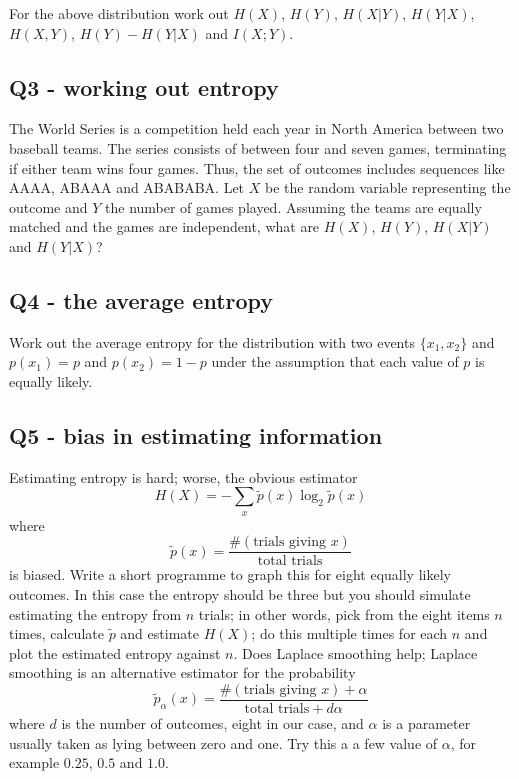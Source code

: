 \documentclass[12pt]{article}
\begin{document}
For the above distribution work out $H(X)$, $H(Y)$, $H(X|Y)$,
$H(Y|X)$, $H(X,Y)$, $H(Y)-H(Y|X)$ and $I(X;Y)$.

\subsection*{Q3 - working out entropy}

The World Series is a competition held each year in North America
between two baseball teams. The series consists of between four and
seven games, terminating if either team wins four games. Thus, the set
of outcomes includes sequences like AAAA, ABAAA and ABABABA. Let $X$
be the random variable representing the outcome and $Y$ the number of
games played. Assuming the teams are equally matched and the games are
independent, what are $H(X)$, $H(Y)$, $H(X|Y)$ and $H(Y|X)$?

\subsection*{Q4 - the average entropy}

Work out the average entropy for the distribution with two events
$\{x_1,x_2\}$ and $p(x_1)=p$ and $p(x_2)=1-p$ under the assumption
that each value of $p$ is equally likely.


\subsection*{Q5 - bias in estimating information}

Estimating entropy is hard; worse, the obvious estimator
\begin{equation}
  H(X)=-\sum_x \tilde{p}(x)\log_2\tilde{p}(x)
\end{equation}
where
\begin{equation}
  \tilde{p}(x)=\frac{\#(\mbox{trials giving }x)}{\mbox{total trials}}
\end{equation}
is biased. Write a short programme to graph this for eight equally
likely outcomes. In this case the entropy should be three but you
should simulate estimating the entropy from $n$ trials; in other
words, pick from the eight items $n$ times, calculate $\tilde{p}$ and
estimate $H(X)$; do this multiple times for each $n$ and plot the
estimated entropy against $n$. Does Laplace smoothing help; Laplace
smoothing is an alternative estimator for the probability
\begin{equation}
  \tilde{p}_\alpha(x)=\frac{\#(\mbox{trials giving }x)+\alpha}{\mbox{total trials}+d\alpha}
\end{equation}
where $d$ is the number of outcomes, eight in our case, and $\alpha$
is a parameter usually taken as lying between zero and one. Try this a
a few value of $\alpha$, for example $0.25$, $0.5$ and $1.0$.


{}
\end{document}
